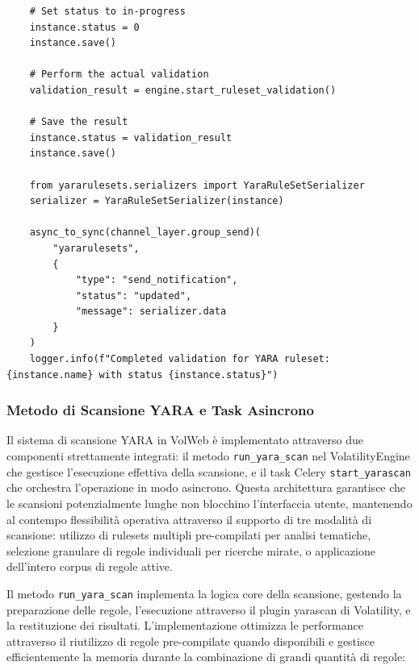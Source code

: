 \begin{verbatim}
    # Set status to in-progress
    instance.status = 0
    instance.save()
    
    # Perform the actual validation
    validation_result = engine.start_ruleset_validation()
    
    # Save the result
    instance.status = validation_result
    instance.save()
        
    from yararulesets.serializers import YaraRuleSetSerializer
    serializer = YaraRuleSetSerializer(instance)
    
    async_to_sync(channel_layer.group_send)(
        "yararulesets",
        {
            "type": "send_notification",
            "status": "updated",
            "message": serializer.data
        }
    )
    logger.info(f"Completed validation for YARA ruleset: {instance.name} with status {instance.status}")
\end{verbatim}

\subsubsection{Metodo di Scansione YARA e Task Asincrono}

Il sistema di scansione YARA in VolWeb è implementato attraverso due componenti strettamente integrati: il metodo \texttt{run\_yara\_scan} nel VolatilityEngine che gestisce l'esecuzione effettiva della scansione, e il task Celery \texttt{start\_yarascan} che orchestra l'operazione in modo asincrono. Questa architettura garantisce che le scansioni potenzialmente lunghe non blocchino l'interfaccia utente, mantenendo al contempo flessibilità operativa attraverso il supporto di tre modalità di scansione: utilizzo di rulesets multipli pre-compilati per analisi tematiche, selezione granulare di regole individuali per ricerche mirate, o applicazione dell'intero corpus di regole attive.

Il metodo \texttt{run\_yara\_scan} implementa la logica core della scansione, gestendo la preparazione delle regole, l'esecuzione attraverso il plugin yarascan di Volatility, e la restituzione dei risultati. L'implementazione ottimizza le performance attraverso il riutilizzo di regole pre-compilate quando disponibili e gestisce efficientemente la memoria durante la combinazione di grandi quantità di regole:

